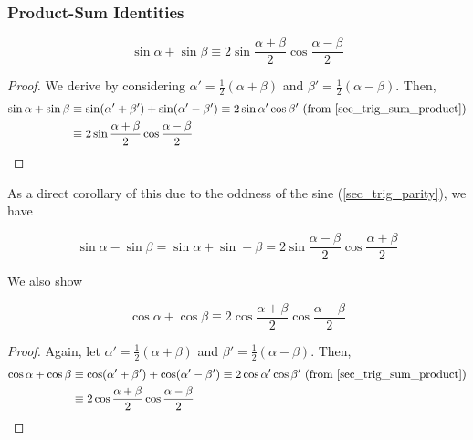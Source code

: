 \subsubsection{Product-Sum Identities} \label{sec_trig_product_sum}


\begin{theorem}
\begin{equation*}
\sin \alpha + \sin \beta \equiv
    2 \sin \frac{\alpha + \beta}2 \cos \frac{\alpha - \beta}2
\end{equation*}
\end{theorem}
\begin{proof}
We derive by considering \(\alpha' = \frac 12 (\alpha + \beta)\) and
\(\beta' = \frac 12 (\alpha - \beta)\). Then,
\begin{align*}
\sin \alpha + \sin \beta &\equiv
 \sin(\alpha' + \beta') + \sin(\alpha' - \beta') \equiv
 2\sin \alpha' \cos \beta'\ \text{(from \ref{sec_trig_sum_product})}
\\&\equiv 2 \sin \frac{\alpha + \beta}2 \cos \frac{\alpha - \beta} 2
    \qedhere
\end{align*}
\end{proof}
As a direct corollary of this due to the oddness of the sine
(\ref{sec_trig_parity}), we have
\begin{theorem}
\begin{equation*}
\sin \alpha - \sin \beta =
    \sin \alpha + \sin -\beta =
    2 \sin \frac{\alpha - \beta} 2 \cos\frac{\alpha + \beta} 2
\end{equation*}
\end{theorem}
We also show
\begin{theorem}
\begin{equation*}
\cos \alpha + \cos \beta \equiv
    2 \cos\frac{\alpha + \beta} 2 \cos \frac{\alpha - \beta} 2
\end{equation*}
\end{theorem}
\begin{proof}
Again, let \(\alpha' = \frac 12 (\alpha + \beta)\) and
\(\beta' = \frac 12 (\alpha - \beta)\). Then,
\begin{align*}
 \cos \alpha + \cos \beta &\equiv
 \cos(\alpha' + \beta') + \cos(\alpha' - \beta') \equiv
 2\cos \alpha' \cos \beta'\ \text{(from \ref{sec_trig_sum_product})}
 \\&\equiv 2 \cos\frac{\alpha + \beta} 2 \cos \frac{\alpha - \beta} 2
    \qedhere
\end{align*}
\end{proof}
